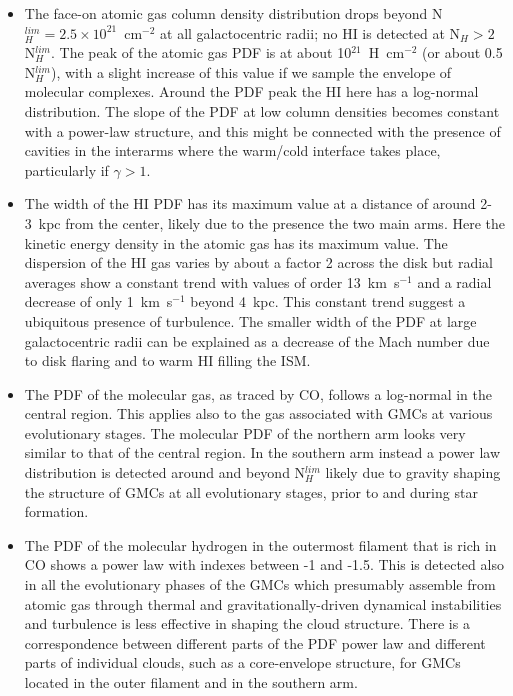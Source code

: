 \documentclass{aa}
\begin{document}
 \begin{itemize}

 \item The face-on atomic gas column density distribution drops  
     beyond  N$_H^{lim} = 2.5 \times 10^{21}$~cm$^{-2}$ at all galactocentric radii;
     no HI is detected at N$_H > 2 $N$_H^{lim}$. The
     peak of the atomic gas PDF is at about 10$^{21}$~H~cm$^{-2}$ (or about 0.5 N$_H^{lim}$), with a slight
     increase of this value if we sample the envelope of molecular complexes.
     Around the PDF peak the HI here has a log-normal distribution. The slope of the PDF at low
     column densities becomes constant with a power-law structure, and this
     might be connected with the presence of cavities in the interarms where the
     warm/cold interface takes place, particularly if $\gamma >1$.

 \item The width of the HI PDF has its maximum value at a distance of around
     2-3~kpc from the center, likely due to the presence the two main arms. Here
     the kinetic energy density in the atomic gas has its maximum value. The
     dispersion of the HI gas varies by about a factor 2 across the disk but
     radial averages show a constant trend with values of order 13~km~s$^{-1}$ and a
     radial decrease of only 1~km~s$^{-1}$ beyond 4~kpc.  This constant trend
     suggest a ubiquitous presence of turbulence. The smaller width
     of the PDF at large galactocentric radii can be explained as a decrease 
     of the Mach number due to disk flaring and to warm HI filling the ISM.  

  \item The PDF of the molecular gas, as traced by CO, follows a log-normal in the
      central region. This applies also to the gas associated with GMCs at
      various evolutionary stages. The molecular PDF of the
      northern arm looks very similar to that of the central region. In the
      southern arm instead a power law distribution is detected  around and
      beyond N$_H^{lim}$ likely due to gravity shaping the structure of GMCs  at
      all evolutionary stages, prior to and during star formation.

 \item The PDF of the molecular hydrogen in the outermost filament that is rich
     in CO shows  a power law with indexes between -1 and -1.5. This is
     detected also in all the evolutionary phases of the GMCs which presumably assemble from 
     atomic gas through thermal and gravitationally-driven dynamical instabilities and
     turbulence is less effective in shaping the cloud structure. There is a correspondence 
     between different parts of the PDF power law and different parts of individual clouds, such
     as a core-envelope structure, for GMCs located in the outer filament and in the southern arm.

 \end{itemize}
\end{document}

